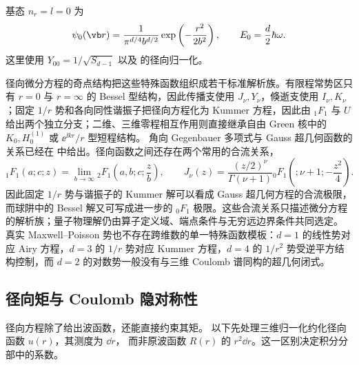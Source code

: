 	基态 \(n_r=l=0\) 为
	\begin{equation}
		\psi_0(\vb r)=\frac{1}{\pi^{d/4}b^{d/2}}\exp\left(-\frac{r^2}{2b^2}\right),
		\qquad
		E_0=\frac{d}{2}\hbar\omega.
	\end{equation}
	这里使用 \(Y_{00}=1/\sqrt{S_{d-1}}\) 以及 的径向归一化。

径向微分方程的奇点结构把这些特殊函数组织成若干标准解析族。有限程常势区只有 $r=0$ 与 $r=\infty$ 的 Bessel 型结构，因此传播支使用 $J_\nu,Y_\nu$，倏逝支使用 $I_\nu,K_\nu$；固定 $1/r$ 势和各向同性谐振子把径向方程化为 Kummer 方程，因此由 ${}_1F_1$ 与 $U$ 给出两个独立分支；二维、三维零程相互作用则直接继承自由 Green 核中的 $K_0,H_0^{(1)}$ 或 $\ee^{\ii kr}/r$ 型短程结构。
角向 Gegenbauer 多项式与 Gauss 超几何函数的关系已经在 中给出。径向函数之间还存在两个常用的合流关系，
\begin{equation}
{}_1F_1(a;c;z)
=\lim_{b\to\infty}{}_2F_1\!\left(a,b;c;\frac{z}{b}\right),
\qquad
J_\nu(z)=\frac{(z/2)^\nu}{\Gamma(\nu+1)}
{}_0F_1\!\left(;\nu+1;-\frac{z^2}{4}\right).
\label{eq:phys-hdqm-hypergeometric-confluence}
\end{equation}
因此固定 $1/r$ 势与谐振子的 Kummer 解可以看成 Gauss 超几何方程的合流极限，而球阱中的 Bessel 解又可写成进一步的 ${}_0F_1$ 极限。这些合流关系只描述微分方程的解析族；量子物理解仍由算子定义域、端点条件与无穷远边界条件共同选定。
真实 Maxwell--Poisson 势也不存在跨维数的单一特殊函数模板：$d=1$ 的线性势对应 Airy 方程，$d=3$ 的 $1/r$ 势对应 Kummer 方程，$d=4$ 的 $1/r^2$ 势受逆平方结构控制，而 $d=2$ 的对数势一般没有与三维 Coulomb 谱同构的超几何闭式。
\subsection{径向矩与 Coulomb 隐对称性}

径向方程除了给出波函数，还能直接约束其矩。
以下先处理三维归一化约化径向函数 $u(r)$，其测度为 $\dd r$，
而非原波函数 $R(r)$ 的 $r^2\dd r$。这一区别决定积分分部中的系数。

